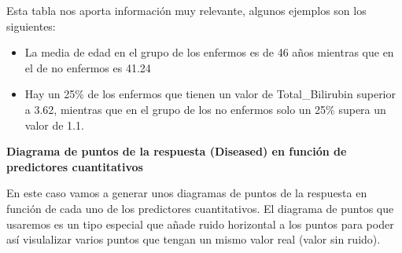 \documentclass[
  11pt,
  a4paper,
]{article}
\begin{document}
Esta tabla nos aporta información muy relevante, algunos ejemplos son
los siguientes:

\begin{itemize}
\item
  La media de edad en el grupo de los enfermos es de 46 años mientras
  que en el de no enfermos es 41.24
\item
  Hay un 25\% de los enfermos que tienen un valor de Total\_Bilirubin
  superior a 3.62, mientras que en el grupo de los no enfermos solo un
  25\% supera un valor de 1.1.
\end{itemize}

\newpage

\textbf{Diagrama de puntos de la respuesta (Diseased) en función de
predictores cuantitativos}

En este caso vamos a generar unos diagramas de puntos de la respuesta en
función de cada uno de los predictores cuantitativos. El diagrama de
puntos que usaremos es un tipo especial que añade ruido horizontal a los
puntos para poder así visulalizar varios puntos que tengan un mismo
valor real (valor sin ruido).

\vspace{0.25cm}
\end{document}

